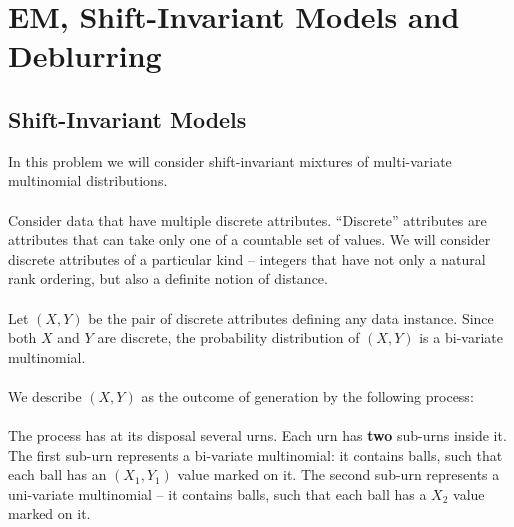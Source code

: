 \section{ EM, Shift-Invariant Models and Deblurring}

\subsection{Shift-Invariant Models}
In this problem we will consider shift-invariant mixtures of multi-variate multinomial distributions.
\\
\\
Consider data that have multiple discrete attributes. ``Discrete'' attributes are attributes that can take only one of a countable set of values.  We will consider discrete attributes of a particular kind -- integers that have not only a natural rank ordering, but also a definite notion of distance. 
\\
\\
Let $(X,Y)$ be the pair of discrete attributes defining any data instance.  
Since both $X$ and $Y$ are discrete, the probability distribution of $(X,Y)$ is a bi-variate multinomial.
\\
\\
We describe $(X,Y)$ as the outcome of generation by the following process:
\\
\\
The process has at its disposal several urns.  Each urn has \textbf{two} sub-urns inside it.  
The first sub-urn represents a bi-variate multinomial:  it contains balls, such that each ball has an $(X_1,Y_1)$ value marked on it.
The second sub-urn represents a uni-variate multinomial -- it contains balls, such that each ball has a $X_2$ value marked on it.

